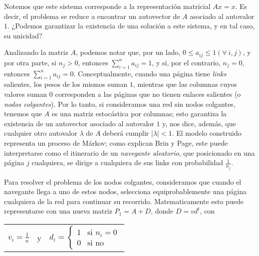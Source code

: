         Notemos que este sistema corresponde a la representación matricial $Ax = x$. Es decir, el problema se reduce a encontrar un autovector de $A$ asociado al autovalor $1$. ¿Podemos garantizar la existencia de una solución a este sistema, y en tal caso, su unicidad?

        Analizando la matriz $A$, podemos notar que, por un lado, $0 \leq a_{ij} \leq 1 (\forall\ i, j)$, y por otra parte, si $n_j > 0$, entonces $\sum_{i=1}^{n} a_{ij} = 1$, y si, por el contrario, $n_j = 0$, entonces $\sum_{i=1}^{n} a_{ij} = 0$. Conceptualmente, cuando una página tiene \emph{links} salientes, los pesos de los mismos suman $1$, mientras que las columnas cuyos valores suman $0$ corresponden a las páginas que no tienen enlaces salientes (o \emph{nodos colgantes}). Por lo tanto, si consideramos una red sin nodos colgantes, tenemos que $A$ es una matriz estocástica por columnas; esto garantiza la existencia de un autovector asociado al autovalor $1$ y, nos dice, además, que cualquier otro autovalor $\lambda$ de $A$ deberá cumplir $|\lambda| < 1$. El modelo construido representa un proceso de Márkov; como explican Brin y Page\cite{Brin1998}, este puede interpretarse como el itinerario de un \emph{navegante aleatorio}, que posicionado en una página $j$ cualquiera, se dirige a cualquiera de sus links con probabilidad $\frac{1}{n_j}$.

        Para resolver el problema de los nodos colgantes, consideramos que cuando el navegante llega a uno de estos nodos, selecciona equiprobablemente una página cualquiera de la red para continuar su recorrido. Matematicamente esto puede representarse con una nueva matriz $P_1 = A + D$, donde $D = v d^t$, con

        \begin{center}\begin{tabular}{ccc}
            $\displaystyle v_i = \frac{1}{n}$ & \qquad y & \qquad $d_i = \begin{cases} 1 & \text{si }n_i = 0 \\ 0 & \text{si no} \end{cases}$
        \end{tabular}\end{center}

